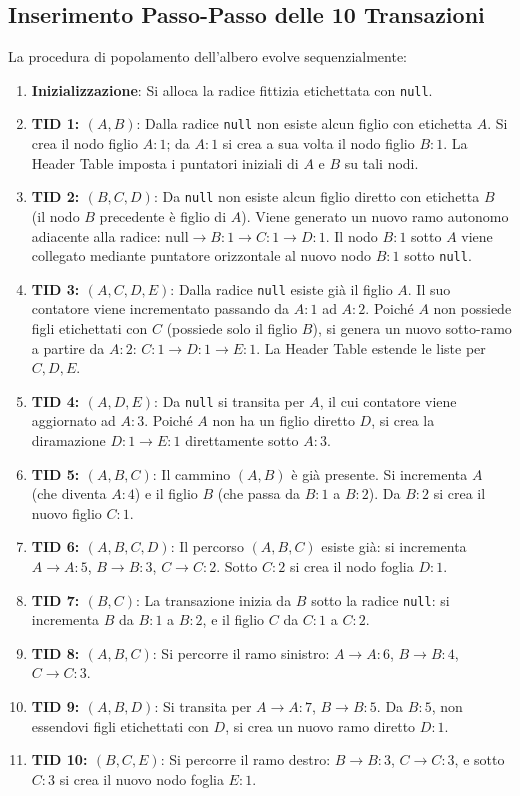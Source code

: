 \FloatBarrier
\subsection{Inserimento Passo-Passo delle 10 Transazioni}
La procedura di popolamento dell'albero evolve sequenzialmente:
\begin{enumerate}[label=\textbf{\arabic*.}]
    \item \textbf{Inizializzazione}: Si alloca la radice fittizia etichettata con \texttt{null}.
    \item \textbf{TID 1: $(A, B)$}: Dalla radice \texttt{null} non esiste alcun figlio con etichetta $A$. Si crea il nodo figlio $A:1$; da $A:1$ si crea a sua volta il nodo figlio $B:1$. La Header Table imposta i puntatori iniziali di $A$ e $B$ su tali nodi.
    \item \textbf{TID 2: $(B, C, D)$}: Da \texttt{null} non esiste alcun figlio diretto con etichetta $B$ (il nodo $B$ precedente è figlio di $A$). Viene generato un nuovo ramo autonomo adiacente alla radice: $\text{null} \to B:1 \to C:1 \to D:1$. Il nodo $B:1$ sotto $A$ viene collegato mediante puntatore orizzontale al nuovo nodo $B:1$ sotto \texttt{null}.
    \item \textbf{TID 3: $(A, C, D, E)$}: Dalla radice \texttt{null} esiste già il figlio $A$. Il suo contatore viene incrementato passando da $A:1$ ad $A:2$. Poiché $A$ non possiede figli etichettati con $C$ (possiede solo il figlio $B$), si genera un nuovo sotto-ramo a partire da $A:2$: $C:1 \to D:1 \to E:1$. La Header Table estende le liste per $C, D, E$.
    \item \textbf{TID 4: $(A, D, E)$}: Da \texttt{null} si transita per $A$, il cui contatore viene aggiornato ad $A:3$. Poiché $A$ non ha un figlio diretto $D$, si crea la diramazione $D:1 \to E:1$ direttamente sotto $A:3$.
    \item \textbf{TID 5: $(A, B, C)$}: Il cammino $(A, B)$ è già presente. Si incrementa $A$ (che diventa $A:4$) e il figlio $B$ (che passa da $B:1$ a $B:2$). Da $B:2$ si crea il nuovo figlio $C:1$.
    \item \textbf{TID 6: $(A, B, C, D)$}: Il percorso $(A, B, C)$ esiste già: si incrementa $A \to A:5$, $B \to B:3$, $C \to C:2$. Sotto $C:2$ si crea il nodo foglia $D:1$.
    \item \textbf{TID 7: $(B, C)$}: La transazione inizia da $B$ sotto la radice \texttt{null}: si incrementa $B$ da $B:1$ a $B:2$, e il figlio $C$ da $C:1$ a $C:2$.
    \item \textbf{TID 8: $(A, B, C)$}: Si percorre il ramo sinistro: $A \to A:6$, $B \to B:4$, $C \to C:3$.
    \item \textbf{TID 9: $(A, B, D)$}: Si transita per $A \to A:7$, $B \to B:5$. Da $B:5$, non essendovi figli etichettati con $D$, si crea un nuovo ramo diretto $D:1$.
    \item \textbf{TID 10: $(B, C, E)$}: Si percorre il ramo destro: $B \to B:3$, $C \to C:3$, e sotto $C:3$ si crea il nuovo nodo foglia $E:1$.
\end{enumerate}

